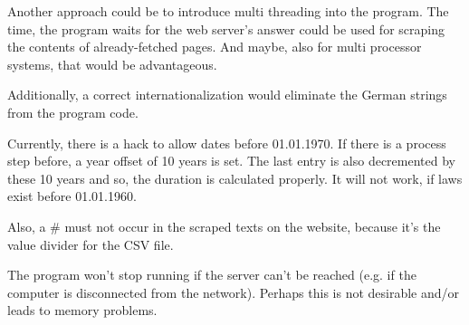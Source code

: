 \documentclass{scrartcl}
\begin{document}
Another approach could be to introduce multi threading into the program. The time, the program waits for the web server's answer could be used for scraping the contents of already-fetched pages. And maybe, also for multi processor systems, that would be advantageous.

Additionally, a correct internationalization would eliminate the German strings from the program code.

Currently, there is a hack to allow dates before 01.01.1970. If there is a process step before, a year offset of 10 years is set. The last entry is also decremented by these 10 years and so, the duration is calculated properly. It will not work, if laws exist before 01.01.1960.

Also, a \# must not occur in the scraped texts on the website, because it's the value divider for the CSV file.

The program won't stop running if the server can't be reached (e.g. if the computer is disconnected from the network). Perhaps this is not desirable and/or leads to memory problems.
\end{document}
